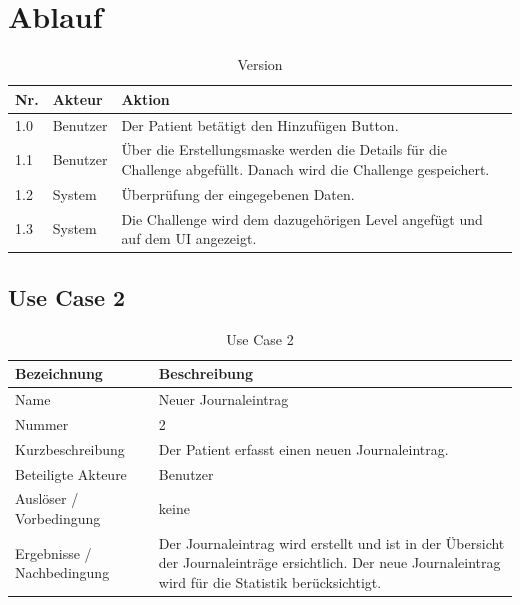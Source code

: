 \section{Ablauf}
\begin{table}[H]
 \caption{Version}
 \begin{tabularx}{\textwidth}{|l|l|X|}
     \hline
     \textbf{Nr.} & \textbf{Akteur} & \textbf{Aktion} \\
     \hline
     1.0          & Benutzer        & Der Patient bet\"{a}tigt den Hinzuf\"{u}gen Button. \\
     \hline
     1.1          & Benutzer        & \"{U}ber die Erstellungsmaske werden die Details f\"{u}r die Challenge abgef\"{u}llt. Danach wird die Challenge gespeichert. \\
     \hline
     1.2          & System          & \"{U}berpr\"{u}fung der eingegebenen Daten.  \\
     \hline
     1.3          & System          & Die Challenge wird dem dazugeh\"{o}rigen Level angef\"{u}gt und auf dem UI angezeigt. \\
     \hline
 \end{tabularx}
 \label{table: Version}
\end{table}

\subsection{Use Case 2}
\begin{table}[H]
 \caption{Use Case 2}
 \begin{tabularx}{\textwidth}{|l|X|}
     \hline
     \textbf{Bezeichnung}       & \textbf{Beschreibung} \\
     \hline
     Name                       & Neuer Journaleintrag \\
     \hline
     Nummer                     & 2 \\
     \hline
     Kurzbeschreibung           & Der Patient erfasst einen neuen Journaleintrag. \\
     \hline
     Beteiligte Akteure         & Benutzer \\
     \hline
     Ausl\"{o}ser / Vorbedingung    & keine \\
     \hline
     Ergebnisse / Nachbedingung & Der Journaleintrag wird erstellt und ist in der \"{U}bersicht der Journaleintr\"{a}ge ersichtlich. Der neue Journaleintrag wird f\"{u}r die Statistik ber\"{u}cksichtigt. \\
     \hline
 \end{tabularx}
 \label{table: Use Case 2}
\end{table}


